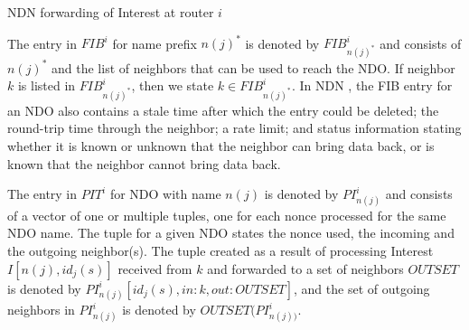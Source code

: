 \documentclass{ancs15-alternate}
\begin{document}
 \vspace{-0.2in}
\begin{algorithm}[h]
\caption{NDN forwarding of Interest at router $i$}
\label{algo-ndn-fw}
{\fontsize{8}{8}\selectfont
\begin{algorithmic}[1]


\ENDIF
		\ENDIF
	\ENDFOR
{}
\ELSE
\ENDIF
\end{algorithmic}}
\end{algorithm}




The entry in $FIB^i$ for  name prefix $n(j)^*$ is denoted by $FIB^i_{n(j)^*}$ and consists of $n(j)^*$ and the list of neighbors that can be used to reach the NDO. 
If neighbor $k$ is listed in $FIB^i_{n(j)^*}$, then we state $k \in FIB^i_{n(j)^*}$. In NDN \cite{ndn-fw2}, the FIB entry for an NDO also contains a stale time after which the entry could be deleted; the round-trip time through the neighbor;  a rate limit; and status information stating whether it is known or unknown that the neighbor can bring data back, or is known that the neighbor cannot bring data back. 

The entry in $PIT^i$ for NDO with name $n(j)$ is denoted by $PI^i_{n(j)}$ and consists of a vector of one or multiple tuples, one for each nonce processed for the same NDO name.
The tuple for a given NDO  states the nonce used, the incoming and the outgoing neighbor(s). The tuple created as a result of processing Interest $I[n(j), id_j(s) ]$ received from $k$ and forwarded to a set of neighbors $OUTSET$  is denoted by  
$PI^i_{n(j)}[ id_j(s), in:k, out:OUTSET ]$, and the set of outgoing neighbors 
in $PI^i_{n(j)}$ is denoted by $OUTSET(PI^i_{n(j) )}$.
\end{document}
